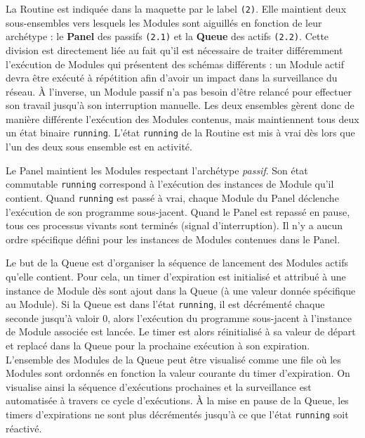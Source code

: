 \documentclass[]{article}
\begin{document}
\par La Routine est indiquée dans la maquette par le label \texttt{(2)}. Elle maintient deux sous-ensembles vers lesquels les Modules sont aiguillés en fonction de leur archétype : le \textbf{Panel} des passifs \texttt{(2.1)} et la \textbf{Queue} des actifs \texttt{(2.2)}. Cette division est directement liée au fait qu'il est nécessaire de traiter différemment l'exécution de Modules qui présentent des schémas différents : un Module actif devra être exécuté à répétition afin d'avoir un impact dans la surveillance du réseau. À l'inverse, un Module passif n'a pas besoin d'être relancé pour effectuer son travail jusqu'à son interruption manuelle. Les deux ensembles gèrent donc de manière différente l'exécution des Modules contenus, mais maintiennent tous deux un état binaire \texttt{running}. L'état \texttt{running} de la Routine est mis à vrai dès lors que l'un des deux sous ensemble est en activité.\\

\par Le Panel maintient les Modules respectant l'archétype \textit{passif}. Son état commutable \texttt{running} correspond à l'exécution des instances de Module qu'il contient. Quand \texttt{running} est passé à vrai, chaque Module du Panel déclenche l'exécution de son programme sous-jacent. Quand le Panel est repassé en pause, tous ces processus vivants sont terminés (signal d'interruption). Il n'y a aucun ordre spécifique défini pour les instances de Modules contenues dans le Panel.\\

\par Le but de la Queue est d'organiser la séquence de lancement des Modules actifs qu'elle contient. Pour cela, un timer d'expiration est initialisé et attribué à une instance de Module dès sont ajout dans la Queue (à une valeur donnée spécifique au Module). Si la Queue est dans l'état \texttt{running}, il est décrémenté chaque seconde jusqu'à valoir 0, alors l'exécution du programme sous-jacent à l'instance de Module associée est lancée. Le timer est alors réinitialisé à sa valeur de départ et replacé dans la Queue pour la prochaine exécution à son expiration. L'ensemble des Modules de la Queue peut être visualisé comme une file où les Modules sont ordonnés en fonction la valeur courante du timer d'expiration. On visualise ainsi la séquence d'exécutions prochaines et la surveillance est automatisée à travers ce cycle d'exécutions. À la mise en pause de la Queue, les timers d'expirations ne sont plus décrémentés jusqu'à ce que l'état \texttt{running} soit réactivé.\\
\end{document}
